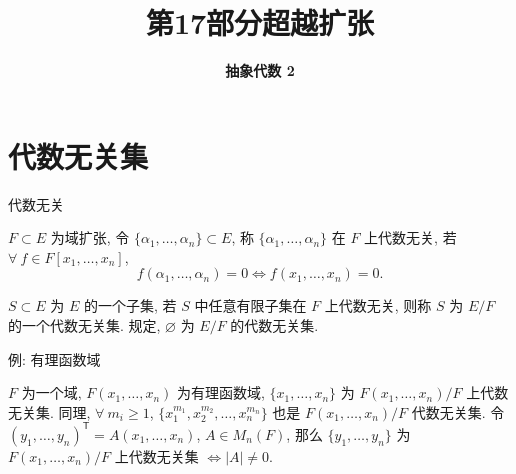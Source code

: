 \everymath{\displaystyle}



\title[超越扩张]{\texorpdfstring{\LARGE \bfseries 第17部分\quad 超越扩张}{第17部分 超越扩张}}
\author[抽象代数 2]{\Large \bfseries 抽象代数 2}
\date{}





\begin{frame}

\titlepage %

\end{frame}


\section[无关集]{代数无关集}


\begin{frame}{代数无关}

$F \subset E$ 为域扩张, 令 $\{ \alpha_1, \dots, \alpha_n \} \subset E$,
称 $\{ \alpha_1, \dots, \alpha_n \}$ 在 $F$ 上代数无关,
若 $\forall\ f \in F[x_1, \dots, x_n]$,
\[
f(\alpha_1, \dots, \alpha_n) = 0 \iff f(x_1, \dots, x_n) = 0.
\]

\pause

$S \subset E$ 为 $E$ 的一个子集, 若 $S$ 中任意有限子集在 $F$ 上代数无关,
则称 $S$ 为 $E/F$ 的一个代数无关集.
规定, $\varnothing$ 为 $E/F$ 的代数无关集.

\end{frame}


\begin{frame}{例: 有理函数域}

\begin{eg}
$F$ 为一个域, $F(x_1, \dots, x_n)$ 为有理函数域,
$\{ x_1, \dots, x_n \}$ 为 $F(x_1, \dots, x_n)/F$ 上代数无关集.
同理, $\forall\ m_i \geq 1$,
$\{ x_1^{m_1}, x_2^{m_2}, \dots, x_n^{m_n} \}$ 也是 $F(x_1, \dots, x_n)/F$
代数无关集.
令 $(y_1, \dots, y_n)^{\mathsf{T}} = A(x_1, \dots, x_n)$, $A \in M_n(F)$,
那么 $\{ y_1, \dots, y_n \}$ 为 $F(x_1, \dots, x_n)/F$ 上代数无关集
$\iff |A| \neq 0$.
\end{eg}

\end{frame}

